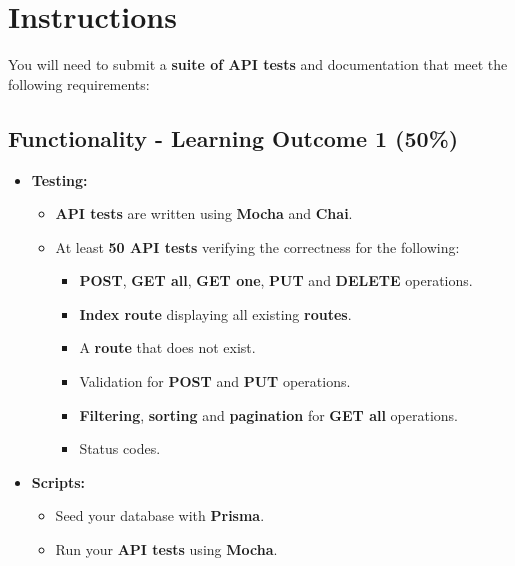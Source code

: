 \documentclass{article}
\begin{document}
\section*{Instructions}
You will need to submit a \textbf{suite of API tests} and documentation that meet the following requirements:

\subsection*{Functionality - Learning Outcome 1 (50\%)}
\begin{itemize}
  \item \textbf{Testing:}
	\begin{itemize}
    \item \textbf{API tests} are written using \textbf{Mocha} and \textbf{Chai}.
    \item At least \textbf{50 API tests} verifying the correctness for the following:
          \begin{itemize}
            \item \textbf{POST}, \textbf{GET all}, \textbf{GET one}, \textbf{PUT} and \textbf{DELETE} operations.
            \item \textbf{Index route} displaying all existing \textbf{routes}.
            \item A \textbf{route} that does not exist.
            \item Validation for \textbf{POST} and \textbf{PUT} operations.
            \item \textbf{Filtering}, \textbf{sorting} and \textbf{pagination} for \textbf{GET all} operations.
            \item Status codes.
          \end{itemize}
	\end{itemize}
	\item \textbf{Scripts:}
	\begin{itemize}
    \item Seed your database with \textbf{Prisma}.
		\item Run your \textbf{API tests} using \textbf{Mocha}.
	\end{itemize}
\end{itemize}
\end{document}
